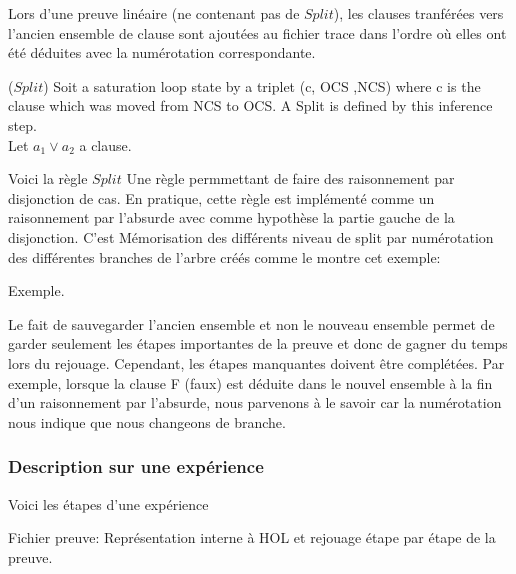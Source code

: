 Lors d'une preuve linéaire (ne contenant pas de $Split$), les clauses tranférées vers l'ancien ensemble de clause sont ajoutées au fichier trace dans l'ordre où elles ont été déduites avec la numérotation correspondante.

\begin{mydef} ($Split$)
Soit a saturation loop state by a triplet (c, OCS ,NCS) where c is the clause which was moved from NCS to OCS. 
A Split is defined by this inference step. 
\\Let $a_1 \vee a_2$ a clause.

\begin{prooftree}
\end{prooftree}  
\end{mydef}  

Voici la règle $Split$
Une règle permmettant de faire des raisonnement par disjonction de cas.
En pratique, cette règle est implémenté comme un raisonnement par l'absurde avec comme hypothèse la partie gauche de la disjonction. C'est 
Mémorisation des différents niveau de split par numérotation des différentes branches de l'arbre créés comme le montre cet exemple:

Exemple.

Le fait de sauvegarder l'ancien ensemble et non le nouveau ensemble permet de garder seulement les étapes importantes de la preuve et donc de gagner du temps lors du rejouage. Cependant, les étapes manquantes doivent être complétées. Par exemple, lorsque la clause F (faux) est déduite dans le nouvel ensemble à la fin d'un raisonnement par l'absurde, nous parvenons à le savoir car la numérotation nous indique que nous changeons de branche.  

\subsubsection{Description sur une expérience}
 Voici les étapes d'une expérience
 
 Fichier preuve:
 Représentation interne à HOL et rejouage étape par étape de la preuve.
 
 


